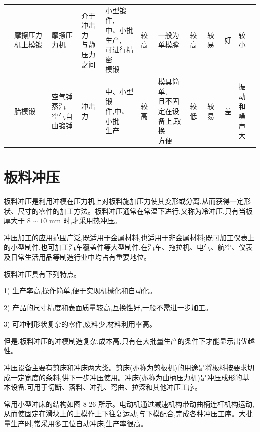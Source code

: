 \documentclass[UTF8]{ctexbook}
\newcommand{\◎}{\ensuremath{\bigcirc}}
\begin{document}
\begin{longtable}[h]{|m{1cm}|m{1cm}|m{2cm}|m{1.5cm}|m{2cm}|m{0.5cm}|m{2cm}|m{0.5cm}|m{0.5cm}|m{0.5cm}|m{1cm}|}
    \cline{2-11}
    & 摩擦压力机上模锻 & 摩擦压力机 & \makecell[l]{介于\\冲击力\\与静压力\\之间} & \makecell[l]{小型锻件,\\中、小批生产,\\可进行精密\\模锻} & 较高 & 一般为单模膛 & 较高 & 较易 & 好 & 较小 \\
    \cline{2-11}
    & 胎模锻 & \makecell[l]{空气锤\\蒸汽-空气自\\由锻锤} & 冲击力 & \makecell[l]{中、小型锻\\件,中、小批\\生产} & 较高 & \makecell[l]{模具简单,\\且不固定在设\\备上,取换\\方便} & 较低 & 较易 & 差 & \makecell[l]{振动和\\噪声大} \\
    \hline
    \end{longtable}

\section{板料冲压}

板料冲压是利用冲模在压力机上对板料施加压力使其变形或分离,从而获得一定形状、尺寸的零件的加工方法。板料冲压通常在常温下进行,又称为冷冲压,只有当板厚大于 $8 \sim 10 \text{ mm}$ 时,才采用热冲压。

冲压加工的应用范围广泛,既适用于金属材料,也适用于非金属材料;既可加工仪表上的小型制件,也可加工汽车覆盖件等大型制件,在汽车、拖拉机、电气、航空、仪表及日常生活用品等制造行业中均占有重要地位。

板料冲压具有下列特点。

1) 生产率高,操作简单,便于实现机械化和自动化。

2) 产品的尺寸精度和表面质量较高,互换性好,一般不需进一步加工。

3) 可冲制形状复杂的零件,废料少,材料利用率高。

但是,板料冲压的冲模制造复杂,成本高,只有在大批量生产的条件下才能显示出优越性。

冲压设备主要有剪床和冲床两大类。剪床(亦称为剪板机)的用途是将板料按要求切成一定宽度的条料,供下一步冲压使用。冲床(亦称为曲柄压力机)是冲压成形的基本设备,可用于切断、落料、冲孔、弯曲、拉深和其他冲压工序。

常用小型冲床的结构如图 8-26 所示。电动机通过减速机构带动曲柄连杆机构运动,从而使固定在滑块上的上模作上下往复运动,与下模配合,完成各种冲压工序。大批量生产时,常采用多工位自动冲床,生产率很高。
\end{document}

